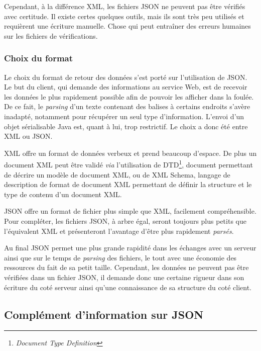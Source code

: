 Cependant, \`a la diff\'erence XML, les fichiers JSON ne peuvent pas \^etre v\'erifi\'es avec certitude.
Il existe certes quelques outils, mais ils sont tr\`es peu utilis\'es et requi\`erent une \'ecriture manuelle. 
Chose qui peut entra\^iner des erreurs humaines sur les fichiers de v\'erifications.

\subsubsection{Choix du format}

Le choix du format de retour des donn\'ees s'est port\'e sur l'utilisation de JSON.
Le but du client, qui demande des informations au service Web, est de recevoir les donn\'ees le plus rapidement possible afin de pouvoir les afficher dans la foul\'ee.
De ce fait, le \textit{parsing} d'un texte contenant des balises \`a certains endroits s'av\`ere inadapt\'e, notamment pour r\'ecup\'erer un seul type d'information.
L'envoi d'un objet s\'erialisable Java est, quant \`a lui, trop restrictif. Le choix a donc \'et\'e entre XML ou JSON.

XML offre un format de donn\'ees verbeux et prend beaucoup d'espace. 
De plus un document XML peut \^etre valid\'e \textit{via} l'utilisation de DTD\protect\footnote{\textit{Document Type Definition}}, document permettant de d\'ecrire un mod\`ele de document XML, ou de XML Schema, langage de description de format de document XML permettant de d\'efinir la structure et le type de contenu d'un document XML.

JSON offre un format de fichier plus simple que XML, facilement compr\'ehensible.
Pour compl\'eter, les fichiers JSON, \`a arbre \'egal, seront toujours plus petits que l'\'equivalent XML et pr\'esenteront l'avantage d'\^etre plus rapidement \textit{pars\'es}.

Au final JSON permet une plus grande rapidit\'e dans les \'echanges avec un serveur ainsi que sur le temps de \textit{parsing} des fichiers, le tout avec une \'economie des ressources du fait de sa petit taille.
Cependant, les donn\'ees ne peuvent pas \^etre v\'erifi\'ees dans un fichier JSON, il demande donc une certaine rigueur dans son \'ecriture du cot\'e serveur ainsi qu'une connaissance de sa structure du cot\'e client.

\subsection{Compl\'ement d'information sur JSON}

